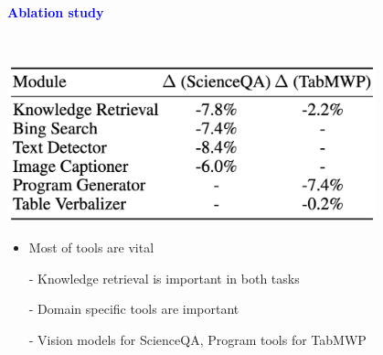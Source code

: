 \documentclass[professionalfont]{beamer}
\begin{document}
\begin{frame}

\begin{center}
    { \textbf{\textcolor{blue}{ {\fontsize{12}{14}\selectfont Ablation study} }} }
\end{center}
\\[0.3cm]

\begin{center}
    \includegraphics[width=0.8\textwidth]{table/5.png}
\end{center}


{\fontsize{10}{14}\selectfont 
\begin{itemize}
    \item Most of tools are vital
    
    - Knowledge retrieval is important in both tasks

    - Domain specific tools are important

    - Vision models for ScienceQA, Program tools for TabMWP
\end{itemize}
}

\end{frame}
\end{document}
